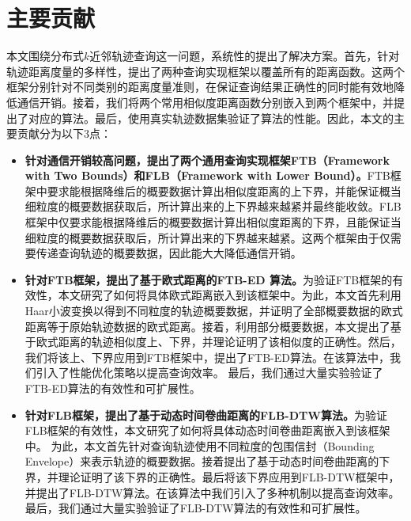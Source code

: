 \section{主要贡献}\label{sec-c1-contribution}
本文围绕分布式$k$近邻轨迹查询这一问题，系统性的提出了解决方案。首先，针对轨迹距离度量的多样性，提出了两种查询实现框架以覆盖所有的距离函数。这两个框架分别针对不同类别的距离度量准则，在保证查询结果正确性的同时能有效地降低通信开销。接着，我们将两个常用相似度距离函数分别嵌入到两个框架中，并提出了对应的算法。最后，使用真实轨迹数据集验证了算法的性能。因此，本文的主要贡献分为以下3点：
\begin{itemize}
	\item  \textbf{针对通信开销较高问题，提出了两个通用查询实现框架FTB（Framework with Two Bounds）和FLB（Framework with Lower Bound）。}FTB框架中要求能根据降维后的概要数据计算出相似度距离的上下界，并能保证概当细粒度的概要数据获取后，所计算出来的上下界越来越紧并最终能收敛。FLB框架中仅要求能根据降维后的概要数据计算出相似度距离的下界，且能保证当细粒度的概要数据获取后，所计算出来的下界越来越紧。这两个框架由于仅需要传递查询轨迹的概要数据，因此能大大降低通信开销。
	
	\item \textbf{针对FTB框架，提出了基于欧式距离的FTB-ED 算法。}为验证FTB框架的有效性，本文研究了如何将具体欧式距离嵌入到该框架中。为此，本文首先利用Haar小波变换以得到不同粒度的轨迹概要数据，并证明了全部概要数据的欧式距离等于原始轨迹数据的欧式距离。接着，利用部分概要数据，本文提出了基于欧式距离的轨迹相似度上、下界，并理论证明了该相似度的正确性。然后，我们将该上、下界应用到FTB框架中，提出了FTB-ED算法。在该算法中，我们引入了性能优化策略以提高查询效率。
	最后，我们通过大量实验验证了FTB-ED算法的有效性和可扩展性。
	
	\item  \textbf{针对FLB框架，提出了基于动态时间卷曲距离的FLB-DTW算法。}为验证FLB框架的有效性，本文研究了如何将具体动态时间卷曲距离嵌入到该框架中。
	为此，本文首先针对查询轨迹使用不同粒度的包围信封（Bounding Envelope）来表示轨迹的概要数据。接着提出了基于动态时间卷曲距离的下界，并理论证明了该下界的正确性。最后将该下界应用到FLB-DTW框架中，并提出了FLB-DTW算法。在该算法中我们引入了多种机制以提高查询效率。最后，我们通过大量实验验证了FLB-DTW算法的有效性和可扩展性。
	
\end{itemize}



